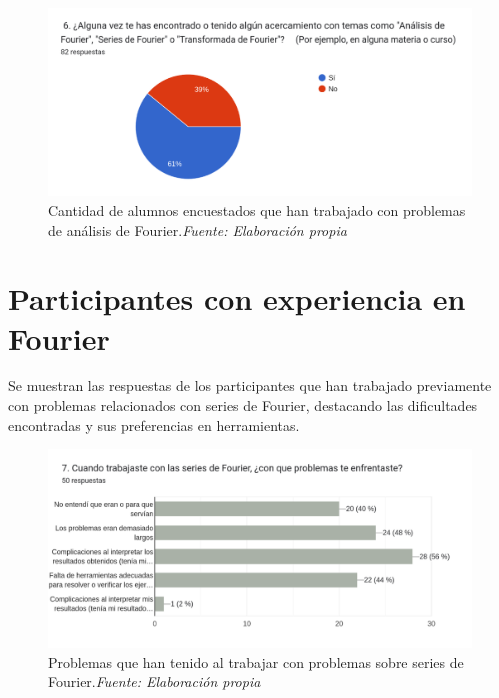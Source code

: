 \begin{figure}[H]
	\centering
	\includegraphics[width=1\textwidth]{img/appendixA/6_Fourier_Filtro.png}
	\caption[Cantidad de alumnos encuestados que han trabajado con problemas de análisis de Fourier.]{Cantidad de alumnos encuestados que han trabajado con problemas de análisis de Fourier.\textit{Fuente: Elaboración propia}}
	\label{fig:app1_Fourier_Filtro}  %
\end{figure}

\newpage
\section{Participantes con experiencia en Fourier}
Se muestran las respuestas de los participantes que han trabajado previamente con problemas relacionados con series de Fourier, destacando las dificultades encontradas y sus preferencias en herramientas.

\begin{figure}[H]
	\centering
	\includegraphics[width=1\textwidth]{img/appendixA/7_problemas_Fourier.png}
	\caption[Problemas que han tenido al trabajar con problemas sobre series de Fourier.]{Problemas que han tenido al trabajar con problemas sobre series de Fourier.\textit{Fuente: Elaboración propia}}
	\label{fig:app1_problemas_Fourier}  %
\end{figure}

